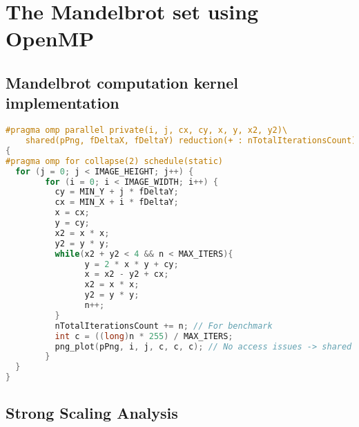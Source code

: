 \section{The Mandelbrot set using OpenMP}
\subsection{Mandelbrot computation kernel implementation}


\begin{lstlisting}[language=C++, caption=Parallel mandelbrot implementation, label=lst:p-mandelbrot]
#pragma omp parallel private(i, j, cx, cy, x, y, x2, y2)\
    shared(pPng, fDeltaX, fDeltaY) reduction(+ : nTotalIterationsCount)
{
#pragma omp for collapse(2) schedule(static)
  for (j = 0; j < IMAGE_HEIGHT; j++) {
		for (i = 0; i < IMAGE_WIDTH; i++) {
		  cy = MIN_Y + j * fDeltaY;
		  cx = MIN_X + i * fDeltaY;
		  x = cx;
		  y = cy;
		  x2 = x * x;
		  y2 = y * y;
		  while(x2 + y2 < 4 && n < MAX_ITERS){
				y = 2 * x * y + cy;
				x = x2 - y2 + cx;
				x2 = x * x;
				y2 = y * y;
				n++;
		  }
		  nTotalIterationsCount += n; // For benchmark
		  int c = ((long)n * 255) / MAX_ITERS;
		  png_plot(pPng, i, j, c, c, c); // No access issues -> shared
		}
  }
}
\end{lstlisting}
\subsection{Strong Scaling Analysis}



